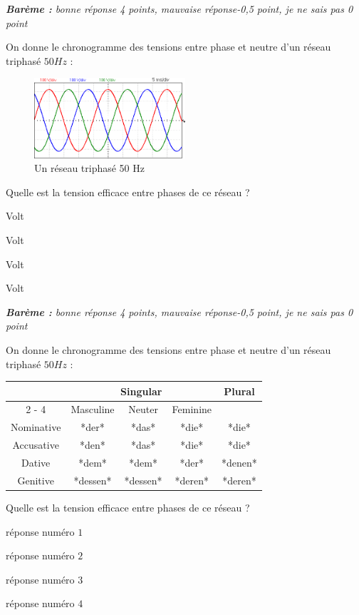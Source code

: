 \documentclass[french,a4paper,answers,addpoints,12pt]{exam}%
\begin{document}
\begin{questions}%
%
\textit{\textbf{Barème :} bonne réponse 4 points, mauvaise réponse-0,5 point, je ne sais pas 0 point}

%
On donne le chronogramme des tensions entre phase et neutre d'un réseau triphasé $50 Hz$ :

%
\begin{figure}[h]%
\centering%
\includegraphics[width=0.5\textwidth]{images/image21001_1.png}%
\caption{Un réseau triphasé 50 Hz}%
\end{figure}

%
\linebreak%
Quelle est la tension efficace entre phases de ce réseau ?

%
\linebreak%
\begin{checkboxes}%
 Volt

%
 Volt

%
 Volt

%
 Volt

%
\end{checkboxes}%
\linebreak%
%
\textit{\textbf{Barème :} bonne réponse 4 points, mauvaise réponse-0,5 point, je ne sais pas 0 point}

%
On donne le chronogramme des tensions entre phase et neutre d'un réseau triphasé $50 Hz$ :

%
\begin{tabular}{|c|c|c|c|c|}%
\hline%
&\multicolumn{3}{|c|}{Singular}&Plural\\%
\cline{2%
-%
4}%
&Masculine&Neuter&Feminine&\\%
\hline%
Nominative&*der*&*das*&*die*&*die*\\%
Accusative&*den*&*das*&*die*&*die*\\%
Dative&*dem*&*dem*&*der*&*denen*\\%
Genitive&*dessen*&*dessen*&*deren*&*deren*\\%
\hline%
\end{tabular}%
\linebreak%
\linebreak%
Quelle est la tension efficace entre phases de ce réseau ?

%
\linebreak%
\begin{checkboxes}%
\choice%
réponse numéro $1$

%
\choice%
réponse numéro $2$

%
\CorrectChoice%
réponse numéro $3$

%
\choice%
réponse numéro $4$

%
\end{checkboxes}%
\linebreak%
\end{questions}%
\end{document}
